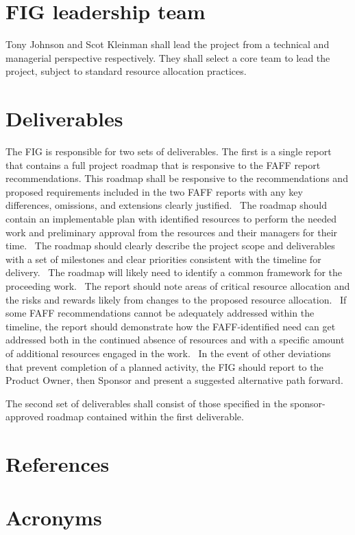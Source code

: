 \documentclass[SE,authoryear,lsstdraft]{lsstdoc}
\begin{document}
\section{FIG leadership team}
Tony Johnson and Scot Kleinman shall lead the project from a technical
and managerial perspective respectively. They shall select a core team
to lead the project, subject to standard resource allocation practices. 


\section{Deliverables}
The FIG is responsible for two sets of deliverables. The first is a
single report that contains a full project roadmap that is responsive to
the FAFF report recommendations. This roadmap shall be responsive to the
recommendations and proposed requirements included in the two FAFF reports
with any key differences, omissions, and extensions clearly justified. 
The roadmap should contain an implementable plan with identified resources
to perform the needed work and preliminary approval from the resources
and their managers for their time.  The roadmap should clearly describe
the project scope and deliverables with a set of milestones and clear
priorities consistent with the timeline for delivery.  The roadmap will
likely need to identify a common framework for the proceeding work.  The
report should note areas of critical resource allocation and the risks
and rewards likely from changes to the proposed resource allocation. 
If some FAFF recommendations cannot be adequately addressed within the
timeline, the report should demonstrate how the FAFF-identified need
can get addressed both in the continued absence of resources and with
a specific amount of additional resources engaged in the work.  In the
event of other deviations that prevent completion of a planned activity,
the FIG should report to the Product Owner, then Sponsor and present a
suggested alternative path forward.


The second set of deliverables shall consist of those specified in the
sponsor-approved roadmap contained within the first deliverable. 


\appendix
\section{References} \label{sec:bib}
\renewcommand{\refname}{} %


\section{Acronyms} \label{sec:acronyms}

\end{document}
